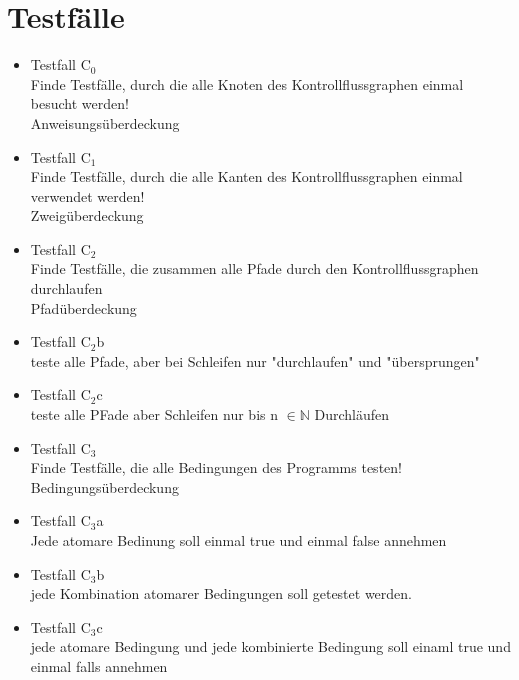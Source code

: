 \section{Testfälle}
\begin{itemize}
\item Testfall C$_{0}$ \\ Finde Testfälle, durch die alle Knoten des Kontrollflussgraphen einmal besucht werden! \\ Anweisungsüberdeckung
\item Testfall C$_{1}$ \\ Finde Testfälle, durch die alle Kanten des Kontrollflussgraphen einmal verwendet werden! \\ Zweigüberdeckung
\item Testfall C$_{2}$ \\ Finde Testfälle, die zusammen alle Pfade durch den Kontrollflussgraphen durchlaufen \\ Pfadüberdeckung 
\item Testfall C$_{2}$b \\ teste alle Pfade, aber bei Schleifen nur "durchlaufen" und "übersprungen"
\item Testfall C$_{2}$c \\ teste alle PFade aber Schleifen nur bis n $\in \mathbb{N}$ Durchläufen
\item Testfall C$_{3}$ \\ Finde Testfälle, die alle Bedingungen des Programms testen! \\ Bedingungsüberdeckung 
\item Testfall C$_{3}$a \\ Jede atomare Bedinung soll einmal true und einmal false annehmen
\item Testfall C$_{3}$b \\ jede Kombination atomarer Bedingungen soll getestet werden.
\item Testfall C$_{3}$c \\ jede atomare Bedingung und jede kombinierte Bedingung soll einaml true und einmal falls annehmen
\end{itemize}
%
%
%
